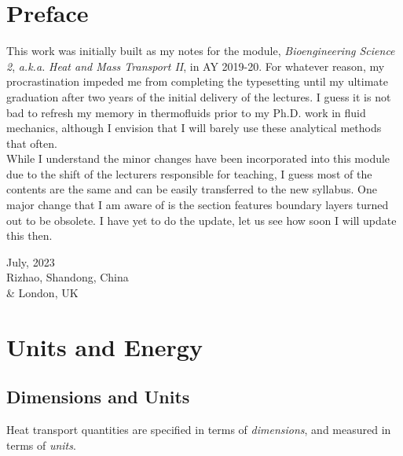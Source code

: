 \documentclass[12pt, a4paper]{article}
\begin{document}
\newpage
\section*{Preface}
This work was initially built as my notes for the module, \textit{Bioengineering Science 2}, \textit{a.k.a.} \textit{Heat and Mass Transport II}, in AY 2019-20. For whatever reason, my procrastination impeded me from completing the typesetting until my ultimate graduation after two years of the initial delivery of the lectures. I guess it is not bad to refresh my memory in thermofluids prior to my Ph.D. work in fluid mechanics, although I envision that I will barely use these analytical methods that often.\\

While I understand the minor changes have been incorporated into this module due to the shift of the lecturers responsible for teaching, I guess most of the contents are the same and can be easily transferred to the new syllabus. One major change that I am aware of is the section features boundary layers turned out to be obsolete. I have yet to do the update, let us see how soon I will update this then.\\

\begin{flushright}
    July, 2023\\
    Rizhao, Shandong, China\\
    \& London, UK
\end{flushright}

\newpage
\tableofcontents %
\newpage
\section{Units and Energy}
\subsection{Dimensions and Units}
Heat transport quantities are specified in terms of \textit{dimensions}, and measured in terms of \textit{units}.
\end{document}
